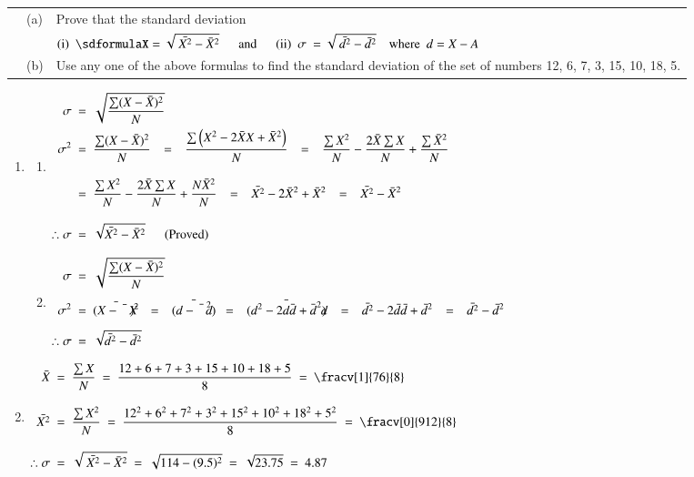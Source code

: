 \documentclass[12pt]{article}
\begin{document}
\pagebreak
\begin{tabularx}{\textwidth}{P{0.7cm}P{0.5cm}X}
   \textbf{} & (a) & Prove that the standard deviation\\
   && $\mathrm{(i)} \ \ \sdformulaX = \sqrt{\ \bar{X^2}-\bar{X}^2} \tabs \text{and} \tabs \mathrm{(ii)} \ \ \sigma \ = \sqrt{\ \bar{d^2}-\bar{d}^2} \quad \text{where\ } \ d=X-A$
   \\[1ex]
   &(b) & Use any one of the above formulas to find the standard deviation of the set of numbers
   12, 6, 7, 3, 15, 10, 18, 5.
\end{tabularx}

\vspace{3ex}
\begin{enumerate}[label=(\alph*)]
   \item
   \begin{enumerate}[label=$\mathrm{(\roman*)}$]
      \item {}
      {$\begin{aligned}
         \sigma \ &= \ \sqrt{\frac{\sum(X-\bar{X})^2}{N}} \\
         \sigma^2 \ &= \ \frac{\sum(X-\bar{X})^2}{N}
          \ \ \  = \ \ \  \frac{\sum\left(X^2-2 \bar{X} X+\bar{X}^2\right)}{N}
          \ \ \  = \ \ \  \frac{\sum X^2}{N} - \frac{2\bar{X}\sum{X}}{N} + \frac{\sum \bar{X}^2}{N}\\[2ex]
          &= \ \frac{\sum X^2}{N} - \frac{2\bar{X}\sum{X}}{N} + \frac{N\bar{X}^2}{N}
          \ \ \  = \ \ \  \bar{X^2} - 2\bar{X}^2 + \bar{X}^2
          \ \ \  = \ \ \  \bar{X^2} - \bar{X}^2 \\[2ex]
          \therefore \sigma \ &= \ \sqrt{\bar{X^2} - \bar{X}^2} \ \ \ \ \ \  \text{(Proved)}
      \end{aligned}$}
      \vspace{5ex}
      \item {}
      {$\begin{aligned}
         \sigma \ &= \ \sqrt{\frac{\sum(X-\bar{X})^2}{N}} \\[1ex]
         \sigma^2 \ &= \ \bar{(X-\bar{X})^2}
         \ \ \  = \ \ \  \bar{(d - \bar{d}^2)}
         \ \ \  = \ \ \  \bar{(d^2 -2d\bar{d} + \bar{d}^2)}
         \ \ \  = \ \ \  \bar{d^2} -2\bar{d}\bar{d} + \bar{d}^2
         \ \ \  = \ \ \  \bar{d^2} - \bar{d}^2\\[1ex]
         \therefore \sigma \ &= \ \sqrt{\bar{d^2} - \bar{d}^2} 
      \end{aligned}$}
   \end{enumerate}
   \vspace{8ex}
   \item {}
   {$\begin{aligned}
      \bar{X} \ &= \ \frac{\sum{X}}{N} \ = \ \frac{12+6+7+3+15+10+18+5}{8} \ = \ \fracv[1]{76}{8}\\[2ex]
      \bar{X^2} \ &= \ \frac{\sum{X^2}}{N} \ = \ \frac{12^2+6^2+7^2+3^2+15^2+10^2+18^2+5^2}{8} \ = \ \fracv[0]{912}{8}\\[2ex]
      \therefore \sigma \ &= \ \sqrt{\ \bar{X^2} - \bar{X}^2}
      \ = \ \sqrt{114 - (9.5)^2} \ = \ \sqrt{23.75} \ = \ 4.87
   \end{aligned}$}
\end{enumerate}
\end{document}
